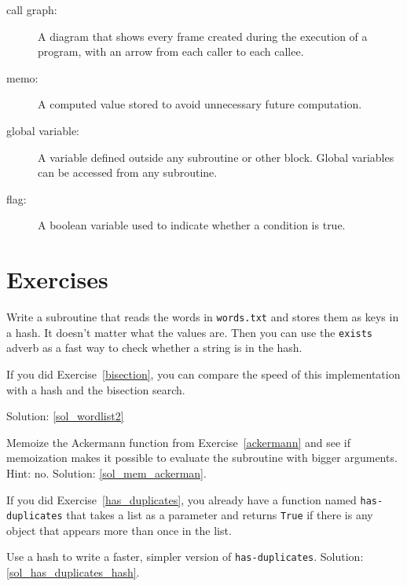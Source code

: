 \begin{description}
\item[call graph:] A diagram that shows every frame created during
the execution of a program, with an arrow from each caller to
each callee. 

\item[memo:] A computed value stored to avoid unnecessary future 
computation.

\item[global variable:]  A variable defined outside any 
subroutine or other block.  Global variables can be 
accessed from any subroutine.

\item[flag:] A boolean variable used to indicate whether a condition
is true.

\end{description}


\section{Exercises}

\begin{exercise}
\label{wordlist2}

Write a subroutine that reads the words in {\tt words.txt} and
stores them as keys in a hash.  It doesn't matter what the
values are.  Then you can use the {\tt exists} adverb
as a fast way to check whether a string is in
the hash.

If you did Exercise~\ref{bisection}, you can compare the speed
of this implementation with a hash and the bisection search.

Solution: \ref{sol_wordlist2}

\end{exercise}


\begin{exercise}
\label{mem_ackerman}
Memoize the Ackermann function from Exercise~\ref{ackermann} 
and see if memoization makes it possible to evaluate the 
subroutine with bigger arguments.  Hint: no.
Solution: \ref{sol_mem_ackerman}.

\end{exercise}



\begin{exercise}
\label{has_duplicates_hash}

If you did Exercise~\ref{has_duplicates}, you already have
a function named \verb"has-duplicates" that takes a list
as a parameter and returns {\tt True} if there is any object
that appears more than once in the list.

Use a hash to write a faster, simpler version of
\verb"has-duplicates". 
Solution: \ref{sol_has_duplicates_hash}.

\end{exercise}


